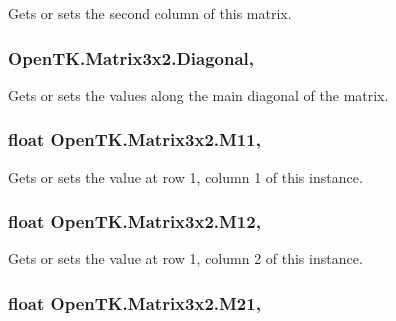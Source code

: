 Gets or sets the second column of this matrix. 

\hypertarget{struct_open_t_k_1_1_matrix3x2_af454457ad7c8805f13571e03ee4303a8}{
\subsubsection[{Diagonal}]{ Open\-T\-K.\-Matrix3x2.\-Diagonal\hspace{0.3cm}{\ttfamily [get]}, {\ttfamily [set]}}}\label{struct_open_t_k_1_1_matrix3x2_af454457ad7c8805f13571e03ee4303a8}


Gets or sets the values along the main diagonal of the matrix. 

\hypertarget{struct_open_t_k_1_1_matrix3x2_a7a97cdaa0dcd0073a4c69434da00a3d2}{
\subsubsection[{M11}]{\setlength{\rightskip}{0pt plus 5cm}float Open\-T\-K.\-Matrix3x2.\-M11\hspace{0.3cm}{\ttfamily [get]}, {\ttfamily [set]}}}\label{struct_open_t_k_1_1_matrix3x2_a7a97cdaa0dcd0073a4c69434da00a3d2}


Gets or sets the value at row 1, column 1 of this instance. 

\hypertarget{struct_open_t_k_1_1_matrix3x2_a574ef825368bcb50b8fc8293cdd228be}{
\subsubsection[{M12}]{\setlength{\rightskip}{0pt plus 5cm}float Open\-T\-K.\-Matrix3x2.\-M12\hspace{0.3cm}{\ttfamily [get]}, {\ttfamily [set]}}}\label{struct_open_t_k_1_1_matrix3x2_a574ef825368bcb50b8fc8293cdd228be}


Gets or sets the value at row 1, column 2 of this instance. 

\hypertarget{struct_open_t_k_1_1_matrix3x2_af3969ee982b72a91dda03f5b26842fda}{
\subsubsection[{M21}]{\setlength{\rightskip}{0pt plus 5cm}float Open\-T\-K.\-Matrix3x2.\-M21\hspace{0.3cm}{\ttfamily [get]}, {\ttfamily [set]}}}\label{struct_open_t_k_1_1_matrix3x2_af3969ee982b72a91dda03f5b26842fda}


